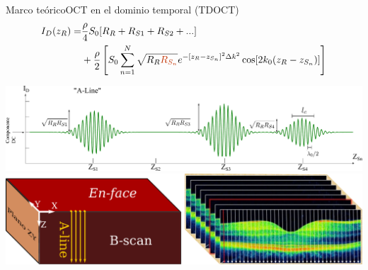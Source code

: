 \documentclass[fleqn,10pt]{beamer}
\newlength{\overwritelength}
\newlength{\minimumoverwritelength}
\newcommand{\overwrite}[3][red]{%
	\settowidth{\overwritelength}{$#2$}%
	\ifdim\overwritelength<\minimumoverwritelength%
	\setlength{\overwritelength}{\minimumoverwritelength}\fi%
	\stackrel
	{%
		\begin{minipage}{\overwritelength}%
			\color{#1!40}\centering\tiny #3\\%
			\rule{1pt}{3pt}%
		\end{minipage}}
	{\colorbox{#1!40}{\color{myGray}$\displaystyle#2$}}}
\begin{document}
\begin{frame}{Marco teórico}{OCT en el dominio temporal (TDOCT)}
	{\small \begin{align*}
		I_D(z_R) = & \frac{\rho}{4}S_0 [R_R+ R_{S1}+ R_{S2}+...]                                                                                  \\ \notag
		           & +\frac{\rho}{2}\left[ S_0 \sum_{n=1}^{N} \sqrt{R_R {\color{blueEQ}R_{S_n}}} e^{-[z_R-z_{S_n}]^2 \Delta k^2}  \cos[2k_0 (z_R-z_{S_n})]\right] 
	\end{align*}}
	
	\begin{center}
		\vfill
		\includegraphics[width=1\linewidth]{AAUgraphics/pt2/A_Line_1Gen}
		\pause
		\vspace*{0.5cm}	
		\includegraphics[width=0.7\linewidth]{AAUgraphics/pt2/Imaging_directions}
	\end{center}
	
	
\end{frame}
\end{document}
